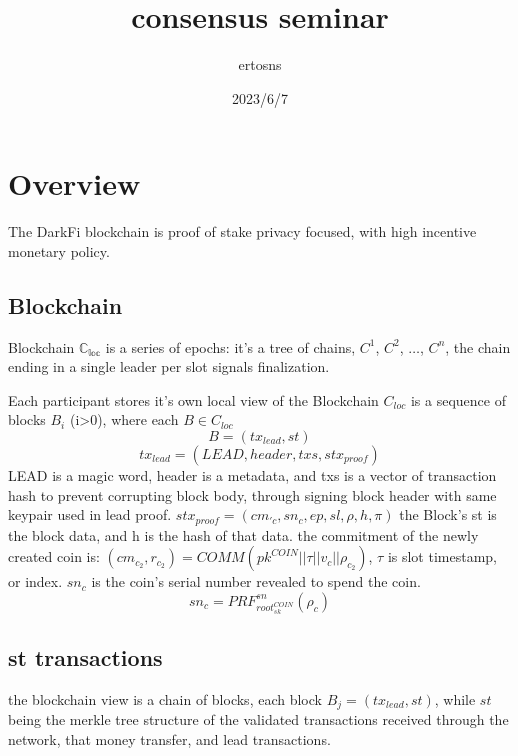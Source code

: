 \documentclass[a4paper]{article}
\title {consensus seminar}
\author {ertosns}
\date {2023/6/7}
\begin{document}
\maketitle

\section{ Overview}

The DarkFi blockchain is  proof of stake  privacy focused, with high incentive monetary policy.

\subsection{ Blockchain}

 Blockchain $\mathbb{C_{loc}}$ is a series of epochs: it's a tree of chains,
$C^1$, $C^2$, $\dots$, $C^n$, the chain ending in a single leader per slot signals finalization.


Each participant stores it's own local view of the Blockchain $C_{loc}$ is a sequence of blocks $B_i$ (i>0), where each $B \in C_{loc}$
$$ B = (tx_{lead},st)$$
$$tx_{lead} = (LEAD, header, txs, stx_{proof})$$
LEAD is a magic word, header is a metadata, and txs is a vector of transaction hash to prevent corrupting block body, through signing block header with same keypair used in lead proof.
$stx_{proof}=(cm_{\prime{c}},sn_c,ep,sl,\rho,h,\pi)$
the Block's st is the block data, and h is the hash of that data.
the commitment of the newly created coin is:
$(cm_{c_2},r_{c_2})=COMM(pk^{COIN}||\tau||v_c||\rho_{c_2})$,
$\tau$ is slot timestamp, or index. $sn_c$ is the coin's serial number revealed to spend the coin.
$$sn_c=PRF_{root_{sk}^{COIN}}^{sn}(\rho_c)$$


\subsection{ st transactions}
the blockchain view is a chain of blocks, each block $B_j=(tx_{lead},st)$, while $st$ being the merkle tree structure of the validated transactions received through the network, that money transfer, and lead transactions.
\end{document}
